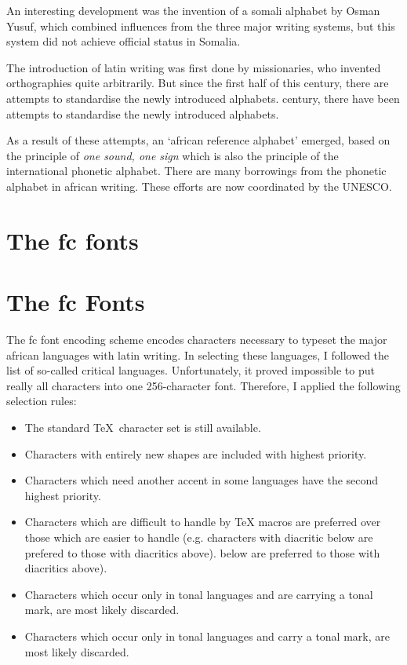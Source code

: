 {An interesting development was the invention of a somali alphabet by 
Osman Yusuf, which combined influences from the three major writing systems, 
but this system did not achieve official status in Somalia.

The introduction of latin writing was first done by missionaries, who 
invented orthographies quite arbitrarily. But since the first half of this 
century, there are attempts to standardise the newly introduced alphabets. 
%
century, there have been
attempts to standardise the newly introduced alphabets. 

As a result of these attempts, an `african reference alphabet' emerged, 
based on the principle of {\em one sound, one sign} which is also the 
principle of the international phonetic alphabet. There are many borrowings 
from the phonetic alphabet in african writing. These efforts are now 
coordinated by the {\sc UNESCO}. 

\section*{The fc fonts}
%
\section*{The fc Fonts}
The fc font encoding scheme encodes characters necessary to typeset the 
major african languages with latin writing. In selecting these languages, I 
followed the list of so-called critical languages. Unfortunately, it proved 
impossible to put really all characters into one 256-character font. 
Therefore, I applied the following selection rules:
\begin{itemize}
\item The standard \TeX\ character set is still available.
\item Characters with entirely new shapes are included with highest 
      priority. 
\item Characters which need another accent in some languages have the 
      second highest priority.
\item Characters which are difficult to handle by TeX macros are preferred 
      over those which are easier to handle (e.g. characters with diacritic 
      below are prefered to those with diacritics above).
%
      below are preferred to those with diacritics above).
\item Characters which occur only in tonal languages and are carrying a 
      tonal mark, are most likely discarded.
%
\item Characters which occur only in tonal languages and carry a 
      tonal mark, are most likely discarded.
\end{itemize}

}
